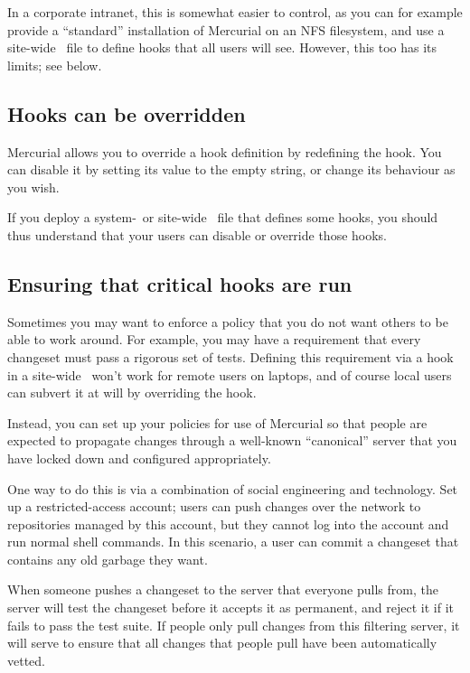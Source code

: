 In a corporate intranet, this is somewhat easier to control, as you
can for example provide a ``standard'' installation of Mercurial on an
NFS filesystem, and use a site-wide \hgrc\ file to define hooks that
all users will see.  However, this too has its limits; see below.

\subsection{Hooks can be overridden}

Mercurial allows you to override a hook definition by redefining the
hook.  You can disable it by setting its value to the empty string, or
change its behaviour as you wish.

If you deploy a system-~or site-wide \hgrc\ file that defines some
hooks, you should thus understand that your users can disable or
override those hooks.

\subsection{Ensuring that critical hooks are run}

Sometimes you may want to enforce a policy that you do not want others
to be able to work around.  For example, you may have a requirement
that every changeset must pass a rigorous set of tests.  Defining this
requirement via a hook in a site-wide \hgrc\ won't work for remote
users on laptops, and of course local users can subvert it at will by
overriding the hook.

Instead, you can set up your policies for use of Mercurial so that
people are expected to propagate changes through a well-known
``canonical'' server that you have locked down and configured
appropriately.

One way to do this is via a combination of social engineering and
technology.  Set up a restricted-access account; users can push
changes over the network to repositories managed by this account, but
they cannot log into the account and run normal shell commands.  In
this scenario, a user can commit a changeset that contains any old
garbage they want.

When someone pushes a changeset to the server that everyone pulls
from, the server will test the changeset before it accepts it as
permanent, and reject it if it fails to pass the test suite.  If
people only pull changes from this filtering server, it will serve to
ensure that all changes that people pull have been automatically
vetted.

